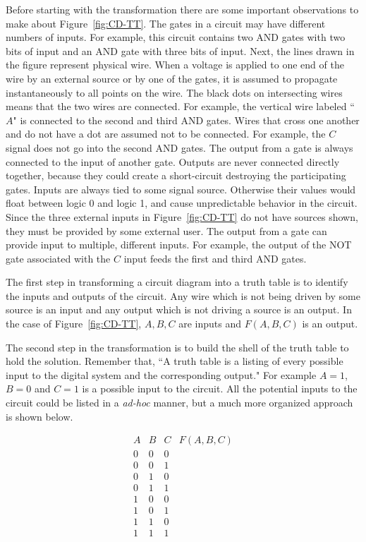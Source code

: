 Before starting with the transformation there are some important
observations to make about Figure~\ref{fig:CD-TT}.  The gates in a circuit 
may have different numbers of inputs.  For example, this circuit contains 
two AND gates with two bits of input and an AND gate with three bits of
input.  Next, the lines drawn in the figure represent physical wire.
When a voltage is applied to one end of the wire by an external source
or by one of the gates, it is assumed to propagate instantaneously to 
all points on the wire.  The black dots on intersecting wires means 
that the two wires are connected.  For example, the vertical wire
labeled ``$A$" is connected to the second and third AND gates. 
 Wires that cross one another and do not have a dot are assumed not
to be connected.  For example, the $C$ signal does not go into the
second AND gates.  The output from a gate is always connected to the
input of another gate.  Outputs are never connected directly together, because 
they could create a short-circuit destroying the participating gates.  Inputs 
are always tied to some signal source. Otherwise their values
would float between logic 0 and logic 1, and cause unpredictable 
behavior in the circuit.  Since
the three external inputs in Figure~\ref{fig:CD-TT} do not have sources shown,
they must be provided by some external user.  The output 
from a gate can provide input to multiple, different inputs.  For example, 
the output of the NOT gate
associated with the $C$ input feeds the first and third AND gates. 

The first step in transforming a circuit diagram into a truth table is
to identify the inputs and outputs of the circuit.
Any wire which is not being driven by some source is an input and 
any output which is not driving a source is an output.  In the case of 
Figure~\ref{fig:CD-TT}, $A,B,C$ are inputs and $F(A,B,C)$ is an output.

The second step in the transformation is to build the shell of the truth 
table to hold the solution.  
Remember that, ``A truth table is a listing of every possible  input to the 
digital system and the corresponding output."  For example $A=1$, $B=0$ and 
$C=1$ is a possible input to the circuit.  All the 
potential inputs to the circuit could be listed in a {\it ad-hoc} 
manner, but a much more organized approach is shown below.

\label{page:TTshell}
$$\begin{array}{c|c|c||c}
A & B & C & F(A,B,C) \\ \hline \hline
0 & 0 & 0 &   \\ \hline
0 & 0 & 1 &   \\ \hline
0 & 1 & 0 &   \\ \hline
0 & 1 & 1 &   \\ \hline
1 & 0 & 0 &   \\ \hline
1 & 0 & 1 &   \\ \hline
1 & 1 & 0 &   \\ \hline
1 & 1 & 1 &   \\
\end{array}$$

